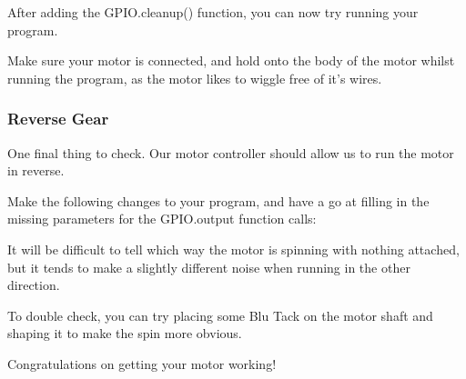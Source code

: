 		
		
		After adding the GPIO.cleanup() function, you can now try running your program.
		
		Make sure your motor is connected, and hold onto the body of the motor whilst running the program, as the motor likes to wiggle free of it's wires.
		
		\subsubsection*{Reverse Gear}
		
			One final thing to check. Our motor controller should allow us to run the motor in reverse. 
			
			Make the following changes to your program, and have a go at filling in the missing parameters for the GPIO.output function calls:
				
			\newpage
			
			
			It will be difficult to tell which way the motor is spinning with nothing attached, but it tends to make a slightly different noise when running in the other direction.
			
			To double check, you can try placing some Blu Tack on the motor shaft and shaping it to make the spin more obvious.
			
			Congratulations on getting your motor working!
			